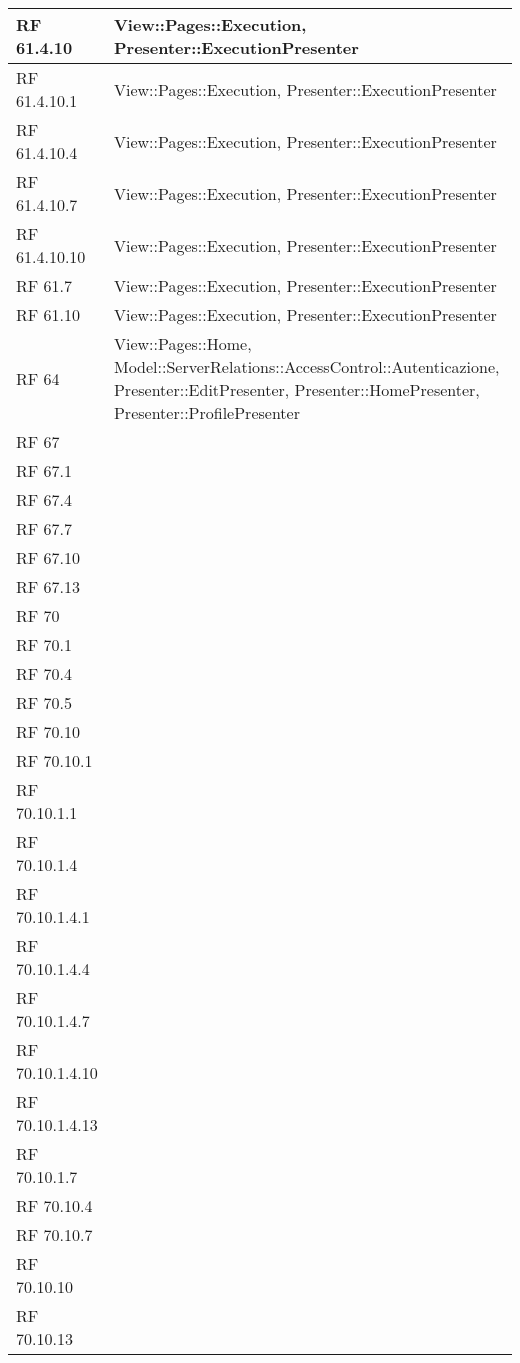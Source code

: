 {\begin{longtable} [c]{| p{3cm} | p{10cm} |}
 \hline 
RF 61.4.10 & View::Pages::Execution, Presenter::ExecutionPresenter\\ 
 \hline 
RF 61.4.10.1 & View::Pages::Execution, Presenter::ExecutionPresenter\\ 
 \hline 
RF 61.4.10.4 & View::Pages::Execution, Presenter::ExecutionPresenter\\ 
 \hline 
RF 61.4.10.7 & View::Pages::Execution, Presenter::ExecutionPresenter\\ 
 \hline 
RF 61.4.10.10 & View::Pages::Execution, Presenter::ExecutionPresenter\\ 
 \hline 
RF 61.7 & View::Pages::Execution, Presenter::ExecutionPresenter\\ 
 \hline 
RF 61.10 & View::Pages::Execution, Presenter::ExecutionPresenter\\ 
 \hline 
RF 64 & View::Pages::Home, Model::ServerRelations::AccessControl::Autenticazione, Presenter::EditPresenter, Presenter::HomePresenter, Presenter::ProfilePresenter\\ 
 \hline 
RF 67 & \\ 
 \hline 
RF 67.1 & \\ 
 \hline 
RF 67.4 & \\ 
 \hline 
RF 67.7 & \\ 
 \hline 
RF 67.10 & \\ 
 \hline 
RF 67.13 & \\ 
 \hline 
RF 70 & \\ 
 \hline 
RF 70.1 & \\ 
 \hline 
RF 70.4 & \\ 
 \hline 
RF 70.5 & \\ 
 \hline 
RF 70.10 & \\ 
 \hline 
RF 70.10.1 & \\ 
 \hline 
RF 70.10.1.1 & \\ 
 \hline 
RF 70.10.1.4 & \\ 
 \hline 
RF 70.10.1.4.1 & \\ 
 \hline 
RF 70.10.1.4.4 & \\ 
 \hline 
RF 70.10.1.4.7 & \\ 
 \hline 
RF 70.10.1.4.10 & \\ 
 \hline 
RF 70.10.1.4.13 & \\ 
 \hline 
RF 70.10.1.7 & \\ 
 \hline 
RF 70.10.4 & \\ 
 \hline 
RF 70.10.7 & \\ 
 \hline 
RF 70.10.10 & \\ 
 \hline 
RF 70.10.13 & \\ 

\end{longtable}}
